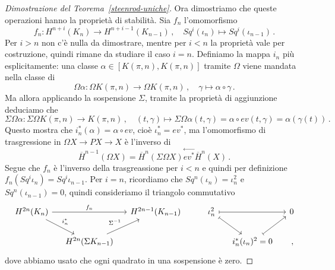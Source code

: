 \begin{proof}[Dimostrazione del Teorema~\ref{steenrod-uniche}]
	Ora dimostriamo che queste operazioni hanno la proprietà di stabilità.
	Sia $f_{n}$ l'omomorfismo
	\begin{equation*}
		f_{n} : H^{n+i}(K_{n}) \longrightarrow H^{n+i-1}(K_{n-1})\,, \quad
		Sq^{i}(\iota_{n}) \longmapsto Sq^{i}(\iota_{n-1})\,.
	\end{equation*}
	Per $i > n$ non c'è nulla da dimostrare, mentre per $i<n$ la proprietà vale per costruzione,
	quindi rimane da studiare il caso $i =n$.
	Definiamo la mappa $i_{n}$ più esplicitamente:
	una classe $\alpha \in [K(\pi,n), K(\pi,n)]$
	tramite $\Omega$ viene mandata nella classe di
	\begin{equation*}
		\Omega \alpha : \Omega K(\pi,n) \longrightarrow \Omega K(\pi,n) \,,
		\quad \gamma \mapsto \alpha \circ \gamma\,.
	\end{equation*}
	Ma allora applicando la sospensione $\Sigma$, 
	tramite la proprietà di aggiunzione deduciamo che
	\begin{equation*}
		\Sigma \Omega \alpha : \Sigma \Omega K(\pi,n) \longrightarrow K(\pi,n)\,,
		\quad (t,\gamma) \longmapsto \Sigma \Omega \alpha (t,\gamma) 
		= \alpha \circ ev(t,\gamma) = \alpha(\gamma(t))\,.
	\end{equation*}
	Questo mostra che $i_{n}^{*}(\alpha) = \alpha \circ ev$, cioè $\iota^{*}_{n} = ev^{*}$,
	ma l'omomorfismo di trasgressione in $\Omega X \to P X \to X$ è l'inverso di
	\begin{equation*}
		\overline{H}^{n-1}(\Omega X) = \overline{H}^{n}(\Sigma \Omega X)
		\overset{\longleftarrow}{ev^{*}} \overline{H}^{n}(X)\,.
	\end{equation*}
	Segue che $f_{n}$ è l'inverso della trasgreassione per $i<n$ e quindi
	per definizione $f_{n}(Sq^{i}\iota_{n}) = Sq^{i}\iota_{n-1}$. 
	Per $i=n$, ricordiamo che $Sq^{n}(\iota_{n}) = \iota_{n}^{2}$ e
	$Sq^{n}(\iota_{n-1})=0$, quindi consideriamo il triangolo commutativo
	\begin{equation*}
		\begin{tikzcd}[column sep=small]
			H^{2n}(K_{n}) \ar[rr, "f_{n}"] \ar[dr, "i^{*}_{n}"]
			& & H^{2n-1}(K_{n-1}) 
			& & \iota_{n}^{2} \ar[rr, mapsto] \ar[dr, mapsto] & & 0 \\
			& H^{2n}(\Sigma K_{n-1}) \ar[ur, "\Sigma^{-1}"] & & &
			& i^{*}_{n}(\iota_{n})^{2}=0 \ar[ur, mapsto] & \,,
		\end{tikzcd}
	\end{equation*}
	dove abbiamo usato che ogni quadrato in una sospensione è zero.
	

\end{proof}
